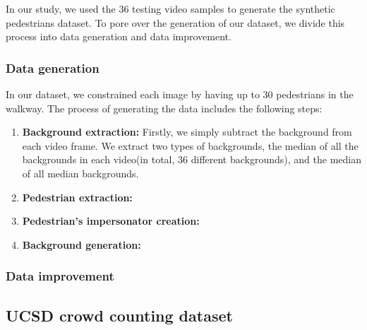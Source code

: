 \indent In our study, we used the 36 testing video samples to generate the synthetic pedestrians dataset. To pore over the generation of our dataset, we divide this process into data generation and data improvement.

  
\subsubsection{Data generation}

In our dataset, we constrained each image by having up to 30 pedestrians in the walkway. The process of generating the data includes the following steps:
\begin{enumerate}

\item \textbf{Background extraction:} Firstly, we simply subtract the background from each video frame. We extract two types of backgrounds, the median of all the backgrounds in each video(in total, 36 different backgrounds), and the median of all median backgrounds.

\item \textbf{Pedestrian extraction:}

\item \textbf{Pedestrian's impersonator creation:}

\item \textbf{Background generation:}

\end{enumerate}

\subsubsection{Data improvement}



\subsection{UCSD crowd counting dataset}